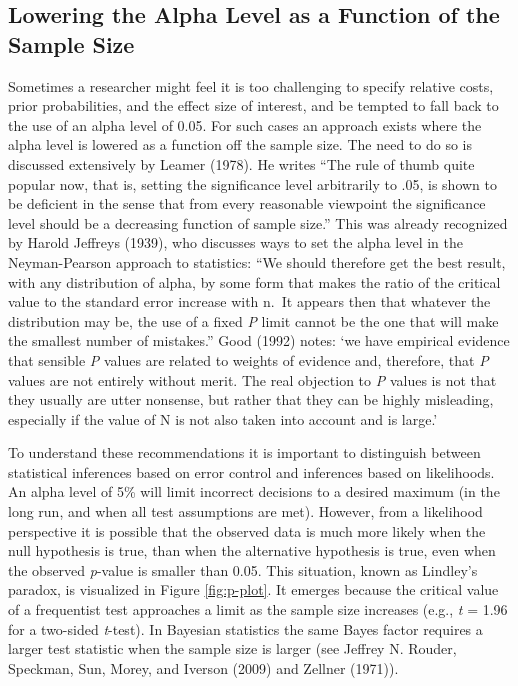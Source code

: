 \documentclass[
  english,
  ,jou,floatsintext]{apa6}
\begin{document}
\hypertarget{lowering-the-alpha-level-as-a-function-of-the-sample-size}{%
\subsection{Lowering the Alpha Level as a Function of the Sample Size}\label{lowering-the-alpha-level-as-a-function-of-the-sample-size}}

Sometimes a researcher might feel it is too challenging to specify relative costs, prior probabilities, and the effect size of interest, and be tempted to fall back to the use of an alpha level of 0.05. For such cases an approach exists where the alpha level is lowered as a function off the sample size. The need to do so is discussed extensively by Leamer (1978). He writes ``The rule of thumb quite popular now, that is, setting the significance level arbitrarily to .05, is shown to be deficient in the sense that from every reasonable viewpoint the significance level should be a decreasing function of sample size.'' This was already recognized by Harold Jeffreys (1939), who discusses ways to set the alpha level in the Neyman-Pearson approach to statistics: ``We should therefore get the best result, with any distribution of alpha, by some form that makes the ratio of the critical value to the standard error increase with n.~It appears then that whatever the distribution may be, the use of a fixed \emph{P} limit cannot be the one that will make the smallest number of mistakes.'' Good (1992) notes: `we have empirical evidence that sensible \emph{P} values are related to weights of evidence and, therefore, that \emph{P} values are not entirely without merit. The real objection to \emph{P} values is not that they usually are utter nonsense, but rather that they can be highly misleading, especially if the value of N is not also taken into account and is large.'

To understand these recommendations it is important to distinguish between statistical inferences based on error control and inferences based on likelihoods. An alpha level of 5\% will limit incorrect decisions to a desired maximum (in the long run, and when all test assumptions are met). However, from a likelihood perspective it is possible that the observed data is much more likely when the null hypothesis is true, than when the alternative hypothesis is true, even when the observed \emph{p}-value is smaller than 0.05. This situation, known as Lindley's paradox, is visualized in Figure \ref{fig:p-plot}. It emerges because the critical value of a frequentist test approaches a limit as the sample size increases (e.g., \emph{t} = 1.96 for a two-sided \emph{t}-test). In Bayesian statistics the same Bayes factor requires a larger test statistic when the sample size is larger (see Jeffrey N. Rouder, Speckman, Sun, Morey, and Iverson (2009) and Zellner (1971)).
\end{document}
